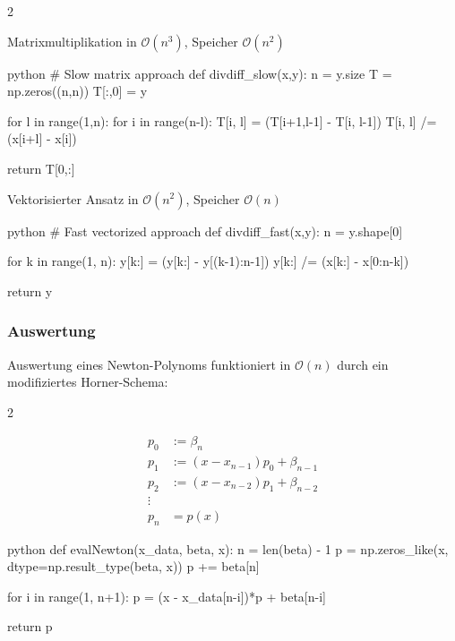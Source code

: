 \begin{multicols}{2}

    Matrixmultiplikation in $\mathcal{O}(n^3)$, Speicher $\mathcal{O}(n^2)$

    \begin{code}{python}
    # Slow matrix approach
    def divdiff_slow(x,y):
        n = y.size
        T = np.zeros((n,n))
        T[:,0] = y

        for l in range(1,n):
            for i in range(n-l):
                T[i, l] = (T[i+1,l-1] - T[i, l-1])
                T[i, l] /= (x[i+l] - x[i])
        
        return T[0,:]
    \end{code}

    \newcolumn


    Vektorisierter Ansatz in $\mathcal{O}(n^2)$, Speicher $\mathcal{O}(n)$

    \begin{code}{python}
    # Fast vectorized approach
    def divdiff_fast(x,y):
        n = y.shape[0]

        for k in range(1, n):
            y[k:] = (y[k:] - y[(k-1):n-1]) 
            y[k:] /= (x[k:] - x[0:n-k])
    
        return y
    \end{code}

\end{multicols}

\subsubsection{Auswertung}

Auswertung eines Newton-Polynoms funktioniert in $\mathcal{O}(n)$ durch ein modifiziertes Horner-Schema:

\begin{multicols}{2}
    
\begin{align*}
    p_0 &:= \beta_n \\
    p_1 &:= (x - x_{n-1})p_0 + \beta_{n-1} \\
    p_2 &:= (x - x_{n-2})p_1 + \beta_{n-2} \\
    \vdots \\
    p_n &= p(x)
\end{align*}

\newcolumn

\begin{code}{python}
    def evalNewton(x_data, beta, x):
        n = len(beta) - 1
        p = np.zeros_like(x, dtype=np.result_type(beta, x))
        p += beta[n]
    
        for i in range(1, n+1):
            p = (x - x_data[n-i])*p + beta[n-i]
      
        return p
\end{code}

\end{multicols}


